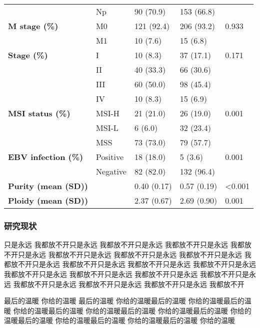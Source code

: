 \begin{table}[htbp]
\begin{tabular}{lllll}
            & Np    & 90 (70.9) & 153 (66.8) &  \\
    \textbf{M stage (\%)} & M0    & 121 (92.4) & 206 (93.2) & 0.933 \\
            & M1    & 10 (7.6) & 15 (6.8) &  \\
    \textbf{Stage (\%)} & I     & 10 (8.3) & 37 (17.1) & 0.171 \\
            & II    & 40 (33.3) & 66 (30.6) &  \\
            & III   & 60 (50.0) & 98 (45.4) &  \\
            & IV    & 10 (8.3) & 15 (6.9) &  \\
    \textbf{MSI status (\%)} & MSI-H & 21 (21.0) & 26 (19.0) & 0.001 \\
            & MSI-L & 6 (6.0) & 32 (23.4) &  \\
            & MSS   & 73 (73.0) & 79 (57.7) &  \\
    \textbf{EBV infection (\%)} & Positive & 18 (18.0) & 5 (3.6) & 0.001 \\
            & Negative & 82 (82.0) & 132 (96.4) &  \\
    \textbf{Purity (mean (SD))} &       & 0.40 (0.17) & 0.57 (0.19) & <0.001 \\
    \textbf{Ploidy (mean (SD))} &       & 2.37 (0.67) & 2.69 (0.90) & 0.001 \\
    \bottomrule
    \end{tabular}%
    \label{table1}%
\end{table}%

\clearpage

\subsubsection{研究现状}

\indent\setlength{\parindent}{2em}%

只是永远 我都放不开只是永远 我都放不开只是永远 我都放不开只是永远 我都放不开只是永远 我都放不开只是永远 我都放不开只是永远 我都放不开只是永远 我都放不开只是永远 我都放不开只是永远 我都放不开只是永远 我都放不开只是永远 我都放不开只是永远 我都放不开只是永远 我都放不开只是永远 我都放不开只是永远 我都放不开只是永远 我都放不开只是永远 我都放不开只是永远 我都放不开

最后的温暖 你给的温暖 最后的温暖 你给的温暖最后的温暖 你给的温暖最后的温暖 你给的温暖最后的温暖 你给的温暖最后的温暖 你给的温暖最后的温暖 你给的温暖最后的温暖 你给的温暖最后的温暖 你给的温暖最后的温暖 你给的温暖

